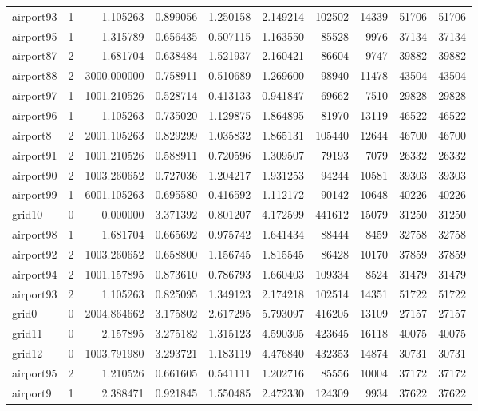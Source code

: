 \begin{longtable}{|l|r|r|r|r|r|r|r|r|r|}
airport93 & 1 & 1.105263 & 0.899056 & 1.250158 & 2.149214 & 102502 & 14339 & 51706 & 51706 \\
airport95 & 1 & 1.315789 & 0.656435 & 0.507115 & 1.163550 & 85528 & 9976 & 37134 & 37134 \\
airport87 & 2 & 1.681704 & 0.638484 & 1.521937 & 2.160421 & 86604 & 9747 & 39882 & 39882 \\
airport88 & 2 & 3000.000000 & 0.758911 & 0.510689 & 1.269600 & 98940 & 11478 & 43504 & 43504 \\
airport97 & 1 & 1001.210526 & 0.528714 & 0.413133 & 0.941847 & 69662 & 7510 & 29828 & 29828 \\
airport96 & 1 & 1.105263 & 0.735020 & 1.129875 & 1.864895 & 81970 & 13119 & 46522 & 46522 \\
airport8 & 2 & 2001.105263 & 0.829299 & 1.035832 & 1.865131 & 105440 & 12644 & 46700 & 46700 \\
airport91 & 2 & 1001.210526 & 0.588911 & 0.720596 & 1.309507 & 79193 & 7079 & 26332 & 26332 \\
airport90 & 2 & 1003.260652 & 0.727036 & 1.204217 & 1.931253 & 94244 & 10581 & 39303 & 39303 \\
airport99 & 1 & 6001.105263 & 0.695580 & 0.416592 & 1.112172 & 90142 & 10648 & 40226 & 40226 \\
grid10 & 0 & 0.000000 & 3.371392 & 0.801207 & 4.172599 & 441612 & 15079 & 31250 & 31250 \\
airport98 & 1 & 1.681704 & 0.665692 & 0.975742 & 1.641434 & 88444 & 8459 & 32758 & 32758 \\
airport92 & 2 & 1003.260652 & 0.658800 & 1.156745 & 1.815545 & 86428 & 10170 & 37859 & 37859 \\
airport94 & 2 & 1001.157895 & 0.873610 & 0.786793 & 1.660403 & 109334 & 8524 & 31479 & 31479 \\
airport93 & 2 & 1.105263 & 0.825095 & 1.349123 & 2.174218 & 102514 & 14351 & 51722 & 51722 \\
grid0 & 0 & 2004.864662 & 3.175802 & 2.617295 & 5.793097 & 416205 & 13109 & 27157 & 27157 \\
grid11 & 0 & 2.157895 & 3.275182 & 1.315123 & 4.590305 & 423645 & 16118 & 40075 & 40075 \\
grid12 & 0 & 1003.791980 & 3.293721 & 1.183119 & 4.476840 & 432353 & 14874 & 30731 & 30731 \\
airport95 & 2 & 1.210526 & 0.661605 & 0.541111 & 1.202716 & 85556 & 10004 & 37172 & 37172 \\
airport9 & 1 & 2.388471 & 0.921845 & 1.550485 & 2.472330 & 124309 & 9934 & 37622 & 37622 \\

\end{longtable}
